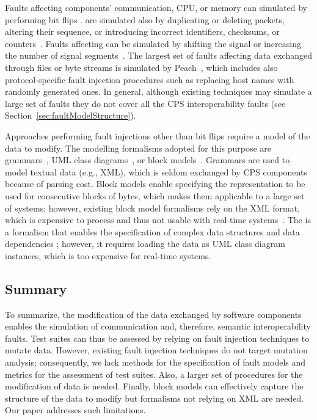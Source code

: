 Faults affecting components' communication, 
CPU, or memory can simulated by performing bit flips 
\cite{tsai1999stress,barton1990fault,han1995doctor,dawson1996testing}.
 are simulated also by duplicating or deleting packets, altering their sequence, or introducing incorrect identifiers, checksums, or counters~\cite{di2015evolutionary,di2015generating}.
Faults affecting  can be simulated by shifting the signal or increasing the number of signal segments~\cite{Matinnejad19}.
The largest set of faults affecting data exchanged through files or byte streams is simulated by Peach~\cite{PeachFuzzer}, which includes also protocol-specific fault injection procedures such as replacing host names with randomly generated ones.
In general, although existing techniques may simulate a large set of faults they do not cover all the CPS interoperability faults (see Section~\ref{sec:faultModelStructure}).

Approaches performing fault injections other than bit flips require a model of the data to modify.
The modelling formalisms adopted for this purpose are grammars~\cite{ghosh1998testing,Godefroid:GrammarBasedFuzzying:2008,godefroid2012sage,bounimova2013billions}, UML class diagrams~\cite{di2015evolutionary,di2015generating}, or block models~\cite{pham2016model,PeachFuzzer}.
Grammars are used to model textual data (e.g., XML), which is seldom exchanged by CPS components because of parsing cost. 
Block models enable specifying the representation to be used for consecutive blocks of bytes, which makes them applicable to a large set of systems; however, existing block model formalisms rely on the XML format, which is expensive to process and thus not usable with real-time systems~\cite{pham2016model,PeachFuzzer}.
The  is a formalism that
enables the specification of complex data structures and 
data dependencies 
\cite{di2015evolutionary,di2015generating}; however, it requires loading the data as UML class diagram instances, which is too expensive for real-time systems. 

\subsection{Summary}

To summarize, the modification of the data exchanged by software components enables the simulation of communication and, therefore, semantic interoperability faults.
Test suites can thus be assessed by relying on fault injection techniques to mutate data. 
However, existing fault injection techniques do not target mutation analysis; consequently, we lack methods for the specification of fault models and metrics for the assessment of test suites. 
Also, a larger set of procedures for the modification of data is needed.
Finally, block models can effectively capture the structure of the data to modify but formalisms not relying on XML are needed. Our paper addresses such limitations.

